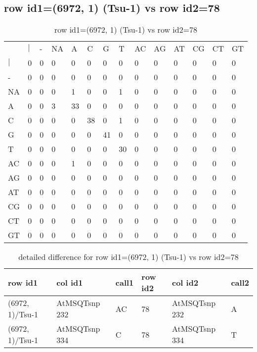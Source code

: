 \subsection{row id1=(6972, 1) (Tsu-1) vs row id2=78}
\begin{center}
\begin{longtable}{|l|l|l|l|l|l|l|l|l|l|l|l|l|l|}
\caption{row id1=(6972, 1) (Tsu-1) vs row id2=78} \label{table_dm192}\\
\hline
\\
\hline
&$|$&-&NA&A&C&G&T&AC&AG&AT&CG&CT&GT\\
$|$&0&0&0&0&0&0&0&0&0&0&0&0&0\\
-&0&0&0&0&0&0&0&0&0&0&0&0&0\\
NA&0&0&0&1&0&0&1&0&0&0&0&0&0\\
A&0&0&3&33&0&0&0&0&0&0&0&0&0\\
C&0&0&0&0&38&0&1&0&0&0&0&0&0\\
G&0&0&0&0&0&41&0&0&0&0&0&0&0\\
T&0&0&0&0&0&0&30&0&0&0&0&0&0\\
AC&0&0&0&1&0&0&0&0&0&0&0&0&0\\
AG&0&0&0&0&0&0&0&0&0&0&0&0&0\\
AT&0&0&0&0&0&0&0&0&0&0&0&0&0\\
CG&0&0&0&0&0&0&0&0&0&0&0&0&0\\
CT&0&0&0&0&0&0&0&0&0&0&0&0&0\\
GT&0&0&0&0&0&0&0&0&0&0&0&0&0\\
\hline
\end{longtable}
\end{center}

\begin{center}
\begin{longtable}{|l|l|l|l|l|l|}
\caption{detailed difference for row id1=(6972, 1) (Tsu-1) vs row id2=78} \label{table_dm193}\\
\hline
row id1&col id1&call1&row id2&col id2&call2\\
\hline
(6972, 1)/Tsu-1&AtMSQTsnp 232&AC&78&AtMSQTsnp 232&A\\
(6972, 1)/Tsu-1&AtMSQTsnp 334&C&78&AtMSQTsnp 334&T\\
\hline
\end{longtable}
\end{center}

